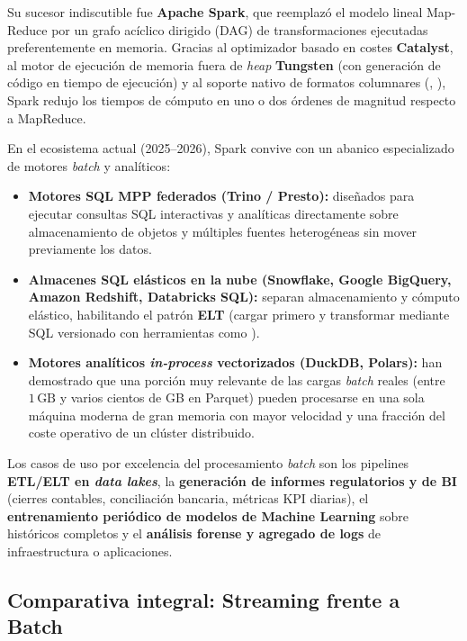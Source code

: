 Su sucesor indiscutible fue \textbf{Apache Spark}, que reemplazó el modelo lineal Map-Reduce por un grafo acíclico dirigido (DAG) de transformaciones ejecutadas preferentemente en memoria. Gracias al optimizador basado en costes \textbf{Catalyst}, al motor de ejecución de memoria fuera de \textit{heap} \textbf{Tungsten} (con generación de código en tiempo de ejecución) y al soporte nativo de formatos columnares (, ), Spark redujo los tiempos de cómputo en uno o dos órdenes de magnitud respecto a MapReduce.

En el ecosistema actual (2025--2026), Spark convive con un abanico especializado de motores \textit{batch} y analíticos:
\begin{itemize}
  \item \textbf{Motores SQL MPP federados (\textbf{Trino} / \textbf{Presto}):} diseñados para ejecutar consultas SQL interactivas y analíticas directamente sobre almacenamiento de objetos y múltiples fuentes heterogéneas sin mover previamente los datos.
  \item \textbf{Almacenes SQL elásticos en la nube (\textbf{Snowflake}, \textbf{Google BigQuery}, \textbf{Amazon Redshift}, \textbf{Databricks SQL}):} separan almacenamiento y cómputo elástico, habilitando el patrón \textbf{ELT} (cargar primero y transformar mediante SQL versionado con herramientas como ).
  \item \textbf{Motores analíticos \textit{in-process} vectorizados (\textbf{DuckDB}, \textbf{Polars}):} han demostrado que una porción muy relevante de las cargas \textit{batch} reales (entre $1\,\text{GB}$ y varios cientos de GB en Parquet) pueden procesarse en una sola máquina moderna de gran memoria con mayor velocidad y una fracción del coste operativo de un clúster distribuido.
\end{itemize}

Los casos de uso por excelencia del procesamiento \textit{batch} son los pipelines \textbf{ETL/ELT en \textit{data lakes}}, la \textbf{generación de informes regulatorios y de BI} (cierres contables, conciliación bancaria, métricas KPI diarias), el \textbf{entrenamiento periódico de modelos de Machine Learning} sobre históricos completos y el \textbf{análisis forense y agregado de logs} de infraestructura o aplicaciones.

\subsection{Comparativa integral: Streaming frente a Batch}\label{subsec:tabla-streaming-batch}

